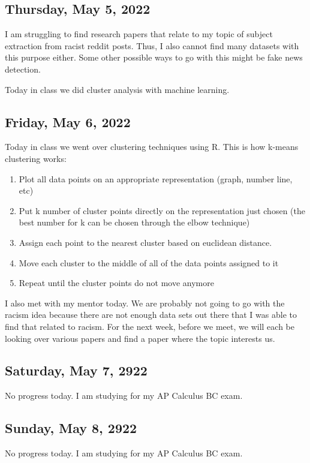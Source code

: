 \documentclass[11pt,letterpaper]{article}
\begin{document}
\subsection{Thursday, May 5, 2022}
I am struggling to find research papers that relate to my topic of subject extraction from racist reddit posts. Thus, I also cannot find many datasets with this purpose either. Some other possible ways to go with this might be fake news detection. 

Today in class we did cluster analysis with machine learning.

\subsection{Friday, May 6, 2022}
Today in class we went over clustering techniques using R. This is how k-means clustering works:
\begin{enumerate}
    \item Plot all data points on an appropriate representation (graph, number line, etc)
    \item Put k number of cluster points directly on the representation just chosen (the best number for k can be chosen through the elbow technique)
    \item Assign each point to the nearest cluster based on euclidean distance. 
    \item Move each cluster to the middle of all of the data points assigned to it
    \item Repeat until the cluster points do not move anymore
\end{enumerate}

I also met with my mentor today. We are probably not going to go with the racism idea because there are not enough data sets out there that I was able to find that related to racism. For the next week, before we meet, we will each be looking over various papers and find a paper where the topic interests us.

\subsection{Saturday, May 7, 2922}
No progress today. I am studying for my AP Calculus BC exam.

\subsection{Sunday, May 8, 2922}
No progress today. I am studying for my AP Calculus BC exam.
\end{document}

